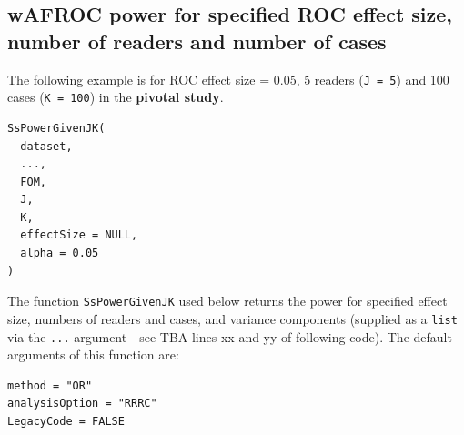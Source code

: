 \documentclass[
]{book}
\begin{document}
\hypertarget{wafroc-power-for-specified-roc-effect-size-number-of-readers-and-number-of-cases}{%
\subsection{wAFROC power for specified ROC effect size, number of readers and number of cases}\label{wafroc-power-for-specified-roc-effect-size-number-of-readers-and-number-of-cases}}

The following example is for ROC effect size = 0.05, 5 readers (\texttt{J\ =\ 5}) and 100 cases (\texttt{K\ =\ 100}) in the \textbf{pivotal study}.

\begin{verbatim}
SsPowerGivenJK(
  dataset,
  ...,
  FOM,
  J,
  K,
  effectSize = NULL,
  alpha = 0.05
)
\end{verbatim}

The function \texttt{SsPowerGivenJK} used below returns the power for specified effect size, numbers of readers and cases, and variance components (supplied as a \texttt{list} via the \texttt{...} argument - see TBA lines xx and yy of following code). The default arguments of this function are:

\begin{verbatim}
method = "OR" 
analysisOption = "RRRC" 
LegacyCode = FALSE
\end{verbatim}
\end{document}
